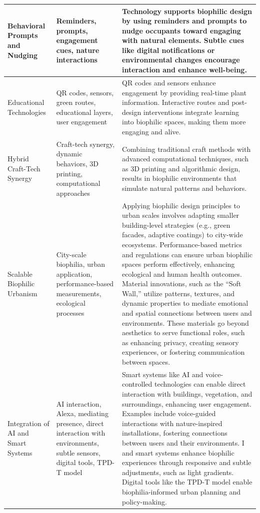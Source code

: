 \begin{longtable}{|p{3cm}|p{3.5cm}|p{7.5cm}|}
Behavioral Prompts and Nudging & Reminders, prompts, engagement cues, nature interactions & Technology supports biophilic design by using reminders and prompts to nudge occupants toward engaging with natural elements. Subtle cues like digital notifications or environmental changes encourage interaction and enhance well-being. \\ \hline

Educational Technologies & QR codes, sensors, green routes, educational layers, user engagement & QR codes and sensors enhance engagement by providing real-time plant information. Interactive routes and post-design interventions integrate learning into biophilic spaces, making them more engaging and alive. \\ 
\hline

Hybrid Craft-Tech Synergy & Craft-tech synergy, dynamic behaviors, 3D printing, computational approaches & Combining traditional craft methods with advanced computational techniques, such as 3D printing and algorithmic design, results in biophilic environments that simulate natural patterns and behaviors. \\ \hline

Scalable Biophilic Urbanism & City-scale biophilia, urban application, performance-based measurements, ecological processes & Applying biophilic design principles to urban scales involves adapting smaller building-level strategies (e.g., green facades, adaptive coatings) to city-wide ecosystems. Performance-based metrics and regulations can ensure urban biophilic spaces perform effectively, enhancing ecological and human health outcomes.  Material innovations, such as the “Soft Wall,” utilize patterns, textures, and dynamic properties to mediate emotional and spatial connections between users and environments. These materials go beyond aesthetics to serve functional roles, such as enhancing privacy, creating sensory experiences, or fostering communication between spaces.\\ \hline

Integration of AI and Smart Systems & AI interaction, Alexa, mediating presence, direct interaction with environments, subtle sensors, digital tools, TPD-T model & Smart systems like AI and voice-controlled technologies can enable direct interaction with buildings, vegetation, and surroundings, enhancing user engagement. Examples include voice-guided interactions with nature-inspired installations, fostering connections between users and their environments. I and smart systems enhance biophilic experiences through responsive and subtle adjustments, such as light gradients. Digital tools like the TPD-T model enable biophilia-informed urban planning and policy-making.  \\
\hline


\end{longtable}
